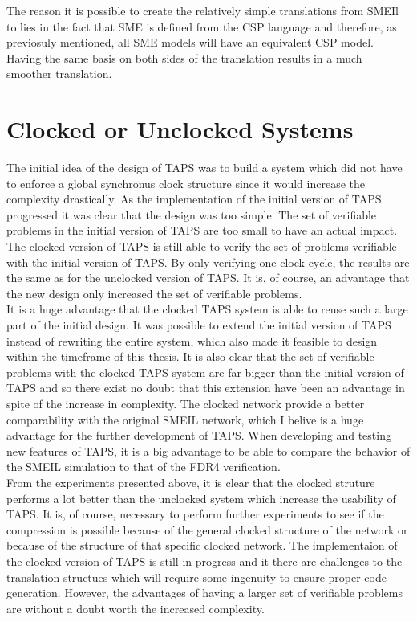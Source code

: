 The reason it is possible to create the relatively simple translations from SMEIl to \cspm{} lies in the fact that SME is defined from the CSP language and therefore, as previosuly mentioned, all SME models will have an equivalent CSP model. Having the same basis on both sides of the translation results in a much smoother translation.

\section{Clocked or Unclocked \cspm{} Systems}
The initial idea of the design of TAPS was to build a system which did not have to enforce a global synchronus clock structure since it would increase the complexity drastically. As the implementation of the initial version of TAPS progressed it was clear that the design was too simple. The set of verifiable problems in the initial version of TAPS are too small to have an actual impact.
The clocked version of TAPS is still able to verify the set of problems verifiable with the initial version of TAPS. By only verifying one clock cycle, the results are the same as for the unclocked version of TAPS. It is, of course, an advantage that the new design only increased the set of verifiable problems. \\

It is a huge advantage that the clocked TAPS system is able to reuse such a large part of the initial design. It was possible to extend the initial version of TAPS instead of rewriting the entire system, which also made it feasible to design within the timeframe of this thesis.
It is also clear that the set of verifiable problems with the clocked TAPS system are far bigger than the initial version of TAPS and so there exist no doubt that this extension have been an advantage in spite of the increase in complexity.
The clocked \cspm{} network provide a better comparability with the original SMEIL network, which I belive is a huge advantage for the further development of TAPS. When developing and testing new features of TAPS, it is a big advantage to be able to compare the behavior of the SMEIL simulation to that of the FDR4 verification. \\

From the experiments presented above, it is clear that the clocked struture performs a lot better than the unclocked system which increase the usability of TAPS. It is, of course, necessary to perform further experiments to see if the compression is possible because of the general clocked structure of the network or because of the structure of that specific clocked network.
The implementaion of the clocked version of TAPS is still in progress and it there are challenges to the translation structues which will require some ingenuity to ensure proper code generation. However, the advantages of having a larger set of verifiable problems are without a doubt worth the increased complexity.
